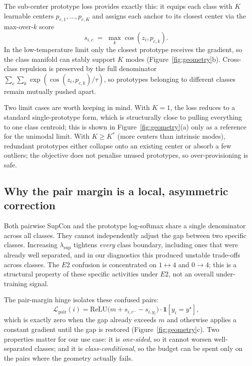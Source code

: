 \documentclass[11pt]{article}
\begin{document}
The sub-center prototype loss provides exactly this: it equips each class with $K$ learnable centers $p_{c,1},\dots,p_{c,K}$ and assigns each anchor to its closest center via the max-over-$k$ score
\[
s_{i,c} \;=\; \max_{k} \cos(z_i, p_{c,k}).
\]
In the low-temperature limit only the closest prototype receives the gradient, so the class manifold can stably support $K$ modes (Figure~\ref{fig:geometry}b). Cross-class repulsion is preserved by the full denominator $\sum_c\sum_k \exp(\cos(z_i,p_{c,k})/\tau)$, so prototypes belonging to different classes remain mutually pushed apart.

Two limit cases are worth keeping in mind. With $K{=}1$, the loss reduces to a standard single-prototype form, which is structurally close to pulling everything to one class centroid; this is shown in Figure~\ref{fig:geometry}(a) only as a reference for the unimodal limit. With $K \ge K^*$ (more centers than intrinsic modes), redundant prototypes either collapse onto an existing center or absorb a few outliers; the objective does not penalise unused prototypes, so over-provisioning is safe.

\subsection*{Why the pair margin is a local, asymmetric correction}

Both pairwise SupCon and the prototype log-softmax share a single denominator across all classes. They cannot independently adjust the gap between two specific classes. Increasing $\lambda_{\mathrm{sup}}$ tightens \emph{every} class boundary, including ones that were already well separated, and in our diagnostics this produced unstable trade-offs across classes. The $E2$ confusion is concentrated on $1\leftrightarrow 4$ and $0\to 4$; this is a structural property of these specific activities under $E2$, not an overall under-training signal.

The pair-margin hinge isolates these confused pairs:
\[
\mathcal{L}_{\mathrm{pair}}(i)
=
\mathrm{ReLU}\!\big(m + s_{i,c^-} - s_{i,y_i}\big)\cdot \mathbf{1}[y_i = y^\star],
\]
which is exactly zero when the gap already exceeds $m$ and otherwise applies a constant gradient until the gap is restored (Figure~\ref{fig:geometry}c). Two properties matter for our use case: it is \emph{one-sided}, so it cannot worsen well-separated classes; and it is \emph{class-conditional}, so the budget can be spent only on the pairs where the geometry actually fails.
\end{document}
